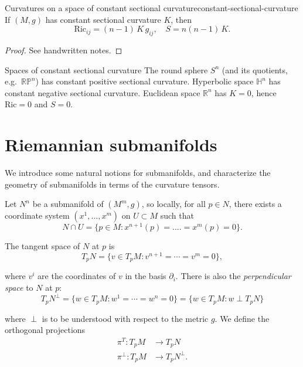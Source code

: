 \begin{colorlem}{Curvatures on a space of constant sectional curvature}{constant-sectional-curvature}
If $(M, g)$ has constant sectional curvature $K$, then
\[
\mathrm{Ric}_{ij} = (n-1)\, K\, g_{ij}, \quad S = n(n-1)\, K.
\]
\end{colorlem}

\begin{proof}
See handwritten notes.
\end{proof}

\begin{colexample}{Spaces of constant sectional curvature}{}
The round sphere $S^n$ (and its quotients, e.g.\ $\mathbb{RP}^n$) has constant positive sectional curvature. Hyperbolic space $\mathbb{H}^n$ has constant negative sectional curvature. Euclidean space $\mathbb{R}^n$ has $K = 0$, hence $\mathrm{Ric} = 0$ and $S = 0$.
\end{colexample}












\section{Riemannian submanifolds}

We introduce some natural notions for submanifolds, and characterize the geometry of submanifolds in terms of the curvature tensors.

Let $N^n$ be a submanifold of $(M^m,g)$, so locally, for all $p\in N$, there exists a coordinate system $(x^1, \ldots, x^m)$ on $U\subset M$ such that 
$$N\cap U=\{p\in M: x^{n+1}(p)=....=x^m(p)=0\}.$$

The tangent space of $N$ at $p$ is 
$$T_pN = \{v\in T_pM: v^{n+1} = \cdots = v^m = 0\},$$

where $v^i$ are the coordinates of $v$ in the basis $\partial_i$. There is also the \emph{perpendicular space} to $N$ at $p$:
$$T_pN^\perp = \{w\in T_pM: w^1 = \cdots = w^n = 0\}=\{w\in T_pM: w\perp T_p N\}$$

where $\perp$ is to be understood with respect to the metric $g$. We define the orthogonal projections 
\begin{align}
\label{eq:projections_submanifold1}
\pi^T: T_pM &\to T_pN \\ 
\label{eq:projections_submanifold2}
\pi^\perp: T_pM &\to T_pN^\perp.
\end{align}

